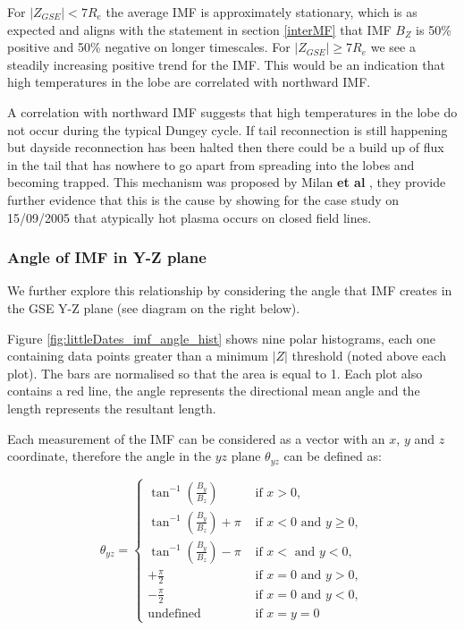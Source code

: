 \documentclass[12pt]{article}
\begin{document}
For $|Z_{GSE}|<7R_e$ the average IMF is approximately stationary, which is as expected and aligns with the statement in section \ref{interMF} that IMF $B_Z$ is 50\% positive and 50\% negative on longer timescales. For $|Z_{GSE}|\ge7R_e$ we see a steadily increasing positive trend for the IMF. This would be an indication that high temperatures in the lobe are correlated with northward IMF. 

A correlation with northward IMF suggests that high temperatures in the lobe do not occur during the typical Dungey cycle. If tail reconnection is still happening but dayside reconnection has been halted then there could be a build up of flux in the tail that has nowhere to go apart from spreading into the lobes and becoming trapped. This mechanism was proposed by Milan \textbf{et al} \cite{TPAdebate}, they provide further evidence that this is the cause by showing for the case study on 15/09/2005 that atypically hot plasma occurs on closed field lines.

\subsubsection{Angle of IMF in Y-Z plane}
We further explore this relationship by considering the angle that IMF creates in the GSE Y-Z plane (see diagram on the right below).

Figure \ref{fig:littleDates_imf_angle_hist} shows nine polar histograms, each one containing data points greater than a minimum $|Z|$ threshold (noted above each plot). The bars are normalised so that the area is equal to 1. Each plot also contains a red line, the angle represents the directional mean angle \cite{mardia_jupp_2000} and the length represents the resultant length. 

Each measurement of the IMF can be considered as a vector with an $x$, $y$ and $z$ coordinate, therefore the angle in the $yz$ plane $\theta_{yz}$ can be defined as:

\begin{equation}
    \theta_{yz}= 
    \begin{cases}
        \tan^{-1}\left(\frac{B_y}{B_z}\right) &\text{ if } x>0, \\
        \tan^{-1}\left(\frac{B_y}{B_z}\right)+\pi &\text{ if } x < 0 \text{ and } y \ge 0, \\
        \tan^{-1}\left(\frac{B_y}{B_z}\right)-\pi &\text{ if } x < \text{ and } y < 0, \\
        +\frac{\pi}{2} &\text{ if } x=0 \text{ and } y > 0, \\
        -\frac{\pi}{2} &\text{ if } x=0 \text{ and } y<0, \\
        \text{undefined} &\text{ if } x=y=0
    \end{cases}
\end{equation}
\end{document}
